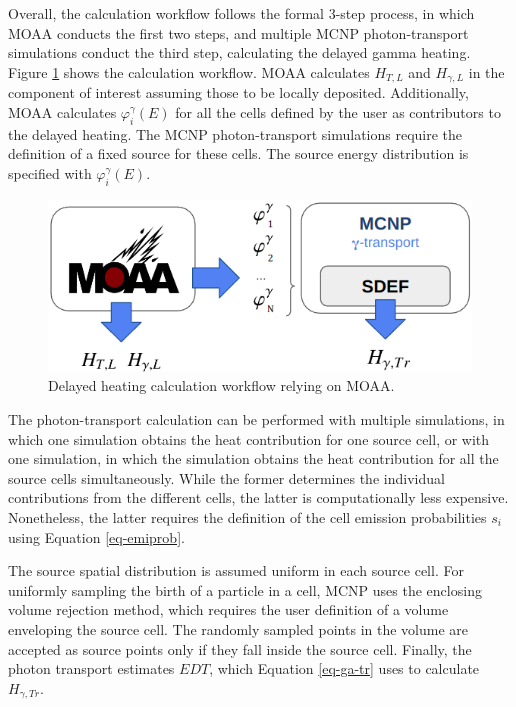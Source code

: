 Overall, the calculation workflow follows the formal 3-step process, in which MOAA conducts the first two steps, and multiple MCNP photon-transport simulations conduct the third step, calculating the delayed gamma heating.
Figure \ref{fig:workflow_3} shows the calculation workflow.
MOAA calculates $H_{T,L}$ and $H_{\gamma, L}$ in the component of interest assuming those to be locally deposited.
Additionally, MOAA calculates $\varphi^\gamma_i(E)$ for all the cells defined by the user as contributors to the delayed heating.
The MCNP photon-transport simulations require the definition of a fixed source for these cells.
The source energy distribution is specified with $\varphi^\gamma_i(E)$.

\begin{figure}[htbp!]
  \begin{center}
    \includegraphics[width=0.70\linewidth]{figures/heat-flow}
  \end{center}
  \caption{Delayed heating calculation workflow relying on MOAA.}
  \label{fig:workflow_3}
\end{figure}


The photon-transport calculation can be performed with multiple simulations, in which one simulation obtains the heat contribution for one source cell, or with one simulation, in which the simulation obtains the heat contribution for all the source cells simultaneously.
While the former determines the individual contributions from the different cells, the latter is computationally less expensive.
Nonetheless, the latter requires the definition of the cell emission probabilities $s_i$ using Equation \ref{eq-emiprob}.

The source spatial distribution is assumed uniform in each source cell.
For uniformly sampling the birth of a particle in a cell, MCNP uses the enclosing volume rejection method, which requires the user definition of a volume enveloping the source cell.
The randomly sampled points in the volume are accepted as source points only if they fall inside the source cell.
Finally, the photon transport estimates $EDT$, which Equation \ref{eq-ga-tr} uses to calculate $H_{\gamma, Tr}$.


